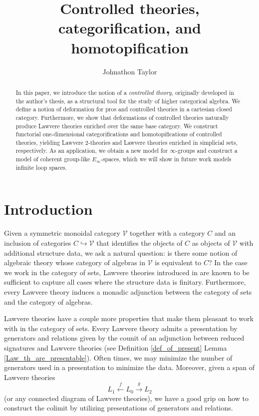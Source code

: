 \documentclass{tac}
\title{Controlled theories, categorification, and homotopification}
\author{Johnathon Taylor}
\begin{document}
\maketitle

\begin{abstract}
In this paper, we introduce the notion of a \emph{controlled theory}, originally
developed in the author's thesis, as a structural tool for
the study of higher categorical algebra. We define a notion of deformation for
pros and controlled theories in a cartesian closed category. Furthermore, we
show that deformations of controlled theories naturally produce Lawvere
theories enriched over the same base category. We construct functorial
one-dimensional categorifications and homotopifications of controlled theories,
yielding Lawvere $2$-theories and Lawvere theories enriched in simplicial sets,
respectively. As an application, we obtain a new model for $\infty$-groups and
construct a model of coherent group-like $E_\infty$-spaces, which we will show
in future work models infinite loop spaces.
\end{abstract}




\tableofcontents

\section{Introduction}
Given a symmetric monoidal category $\mathcal{V}$ together with a category $C$ and an inclusion of categories $C\hookrightarrow\mathcal{V}$ that identifies the objects of $C$ as objects of $\mathcal{V}$ with additional structure data, we ask a natural question: is there some notion of algebraic theory whose category of algebras in $\mathcal{V}$ is equivalent to $C$? In the case we work in the category of sets, Lawvere theories introduced in \cite{Law2} are known to be sufficient to capture all cases where the structure data is finitary. Furthermore, every Lawvere theory induces a monadic adjunction between the category of sets and the category of algebras. 

Lawvere theories have a couple more properties that make them pleasant to work with in the category of sets. Every Lawvere theory admits a presentation by generators and relations given by the counit of an adjunction between reduced signatures and Lawvere theories (see Definition \ref{def_of_present} Lemma \ref{Law_th_are_presentable}). Often times, we may minimize the number of generators used in a presentation to minimize the data. Moreover, given a span of Lawvere theories
\[
L_1\xleftarrow{f}L_0\xrightarrow{g}L_2
\]
(or any connected diagram of Lawvere theories), we have a good grip on how to construct the colimit by utilizing presentations of generators and relations. 
\end{document}
